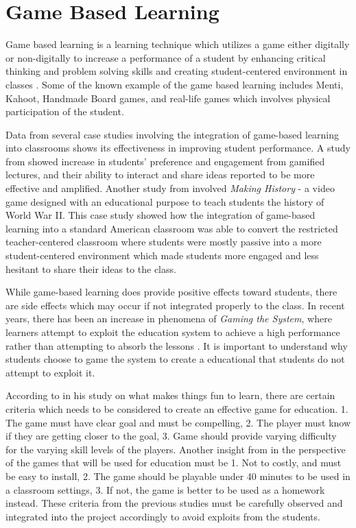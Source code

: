 \section{Game Based Learning}
Game based learning is a learning technique which utilizes a game either digitally or non-digitally to increase a performance of a student by enhancing critical thinking and problem solving skills and creating student-centered environment in classes \cite{tophat:tamosevicius}. Some of the known example of the game based learning includes Menti, Kahoot, Handmade Board games, and real-life games which involves physical participation of the student.

Data from several case studies involving the integration of game-based learning into classrooms shows its effectiveness in improving student performance. A study from \cite{gameOn} showed increase in students' preference and engagement from gamified lectures, and their ability to interact and share ideas reported to be more effective and amplified. Another study from \cite{watson2011} involved \textit{Making History} - a video game designed with an educational purpose to teach students the history of World War II. This case study showed how the integration of game-based learning into a standard American classroom was able to convert the restricted teacher-centered classroom where students were mostly passive into a more student-centered environment which made students more engaged and less hesitant to share their ideas to the class.  

While game-based learning does provide positive effects toward students, there are side effects which may occur if not integrated properly to the class. In recent years, there has been an increase in phenomena of \textit{Gaming the System}, where learners attempt to exploit the education system to achieve a high performance rather than attempting to absorb the lessons \cite{baker2008}. It is important to understand why students choose to game the system to create a educational that students do not attempt to exploit it.

According to \cite{malone1980fun} in his study on what makes things fun to learn, there are certain criteria which needs to be considered to create an effective game for education. 1. The game must have clear goal and must be compelling, 2. The player must know if they are getting closer to the goal, 3. Game should provide varying difficulty for the varying skill levels of the players. Another insight from \cite{mozelius2017} in the perspective of the games that will be used for education must be 1. Not to costly, and must be easy to install, 2. The game should be playable under 40 minutes to be used in a classroom settings, 3. If not, the game is better to be used as a homework instead. These criteria from the previous studies must be carefully observed and integrated into the project accordingly to avoid exploits from the students.  

